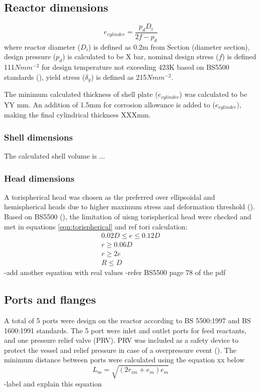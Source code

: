 \subsection{Reactor dimensions}

\begin{equation}
    e_{cylinder} = \frac{p_dD_i}{2f-p_d}
    \label{eqn:minthicknessreactor}
\end{equation}
where reactor diameter ($D_i$) is defined as 0.2m from Section (diameter section), design pressure ($p_d$) is calculated to be X bar, nominal design stress ($f$) is defined 111$Nmm^{-2}$ for design temperature not exceeding 423K based on BS5500 standards (), yield stress ($\delta_y$) is defined as 215$Nmm^{-2}$. 

The minimum calculated thickness of shell plate ($e_{cylinder}$) was calculated to be YY mm. An addition of 1.5mm for corrosion allowance is added to ($e_{cylinder}$), making the final cylindrical thickness XXXmm.
\subsubsection{Shell dimensions}
The calculated shell volume is ...
\subsubsection{Head dimensions}
A torispherical head was chosen as the preferred over ellipsoidal and hemispherical heads due to higher maximum stress and deformation threshold (). 
Based on BS5500 (), the limitation of uisng torispherical head were checked and met in equations \ref{eqn:torispherical} and ref tori calculation:
\begin{equation}
    \begin{split}
        0.02D \leq e \leq 0.12D \\
        r \geq 0.06D \\
        r \geq 2e \\
        R \leq D
    \end{split}
    \label{eqn:torispherical}
\end{equation}
-add another equation with real values
-refer BS5500 page 78 of the pdf
\subsection{Ports and flanges}
A total of 5 ports were design on the reactor according to BS 5500:1997 and BS 1600:1991 standards. The 5 port were inlet and outlet ports for feed reactants, and one pressure relief valve (PRV). PRV was included as a safety device to protect the vessel and relief pressure in case of a overpressure event (). 
The minimum distance between ports were calculated using the equation xx below
\begin{equation}
    L_m = \sqrt{(2r_{im}+e_{m})e_m}
\end{equation}
-label and explain this equation
